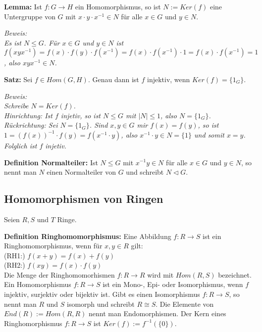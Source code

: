 \documentclass[11pt]{article}
\begin{document}
		\begin{framed}
			\textbf{Lemma:} Ist $f:G\to H$ ein Homomorphismus, so ist $N:=Ker(f)$ eine Untergruppe von $G$ mit $x\cdot y\cdot 
			x^{-1}\in N$ für alle $x\in G$ und $y\in N$.
		\end{framed}
		\textit{Beweis: \\
		Es ist $N\le G$. Für $x\in G$ und $y\in N$ ist $f(xyx^{-1})=f(x)\cdot f(y)\cdot f(x^{-1})=f(x)\cdot f(x^{-1}) \cdot 1=
		f(x)\cdot f(x^{-1})=1$, also $xyx^{-1}\in N$.} \\
		
		\begin{framed}
			\textbf{Satz:} Sei $f\in Hom(G,H)$. Genau dann ist $f$ injektiv, wenn $Ker(f)=\{1_G\}$.
		\end{framed}
		\textit{Beweis: \\
		Schreibe $N=Ker(f)$. \\
		Hinrichtung: Ist $f$ injetiv, so ist $N\le G$ mit $|N|\le 1$, also $N=\{1_G\}$. \\
		Rückrichtung: Sei $N=\{1_G\}$. Sind $x,y\in G$ mir $f(x)=f(y)$, so ist $1=(f(x))^{-1}\cdot f(y)=f(x^{-1}\cdot y)$, 
		also $x^{-1}\cdot y\in N=\{1\}$ und somit $x=y$. Folglich ist $f$ injetiv.} \\
		
		\begin{mdframed}[backgroundcolor=blue!20]
			\textbf{Definition Normalteiler:} Ist $N\le G$ mit $x^{-1}y\in N$ für alle $x\in G$ und $y\in N$, so nennt man $N$ 
			einen Normalteiler von $G$ und schreibt $N\vartriangleleft G$.
		\end{mdframed}
		
	\subsection{Homomorphismen von Ringen}
		Seien $R,S$ und $T$ Ringe.
		
		\begin{mdframed}[backgroundcolor=blue!20]
			\textbf{Definition Ringhomomorphismus:} Eine Abbildung $f:R\to S$ ist ein Ringhomomorphismus, wenn für $x,y\in R$ 
			gilt: \\
			(RH1:) $f(x+y)=f(x)+f(y)$ \\
			(RH2:) $f(xy)=f(x)\cdot f(y)$ \\
			Die Menge der Ringhomomorhismen $f:R\to R$ wird mit $Hom(R,S)$ bezeichnet. Ein Homomorphismus $f:R\to S$ ist ein 
			Mono-, Epi- oder Isomorphismus, wenn $f$ injektiv, surjektiv oder bijektiv ist. Gibt es einen Isomorphismus 
			$f:R\to S$, so nennt man $R$ und $S$ isomorph und schreibt $R\cong S$. Die Elemente von $End(R):= Hom(R,R)$ nennt 
			man Endomorphismen. Der Kern eines Ringhomorphismus $f:R\to S$ ist $Ker(f):= f^{-1}(\{0\})$.
		\end{mdframed}
		
\end{document}
